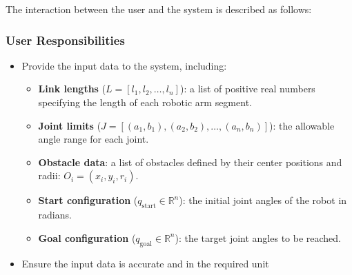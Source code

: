 \documentclass[12pt]{article}
\begin{document}
The interaction between the user and the system is described as follows:

\subsubsection*{User Responsibilities}
\begin{itemize}
    \item Provide the input data to the system, including:
    \begin{itemize}
        \item \textbf{Link lengths} (\(L = [l_1, l_2, \dots, l_n]\)): a list of positive real numbers specifying the length of each robotic arm segment.
        \item \textbf{Joint limits} (\(J = [(a_1, b_1), (a_2, b_2), \dots, (a_n, b_n)]\)): the allowable angle range for each joint.
        \item \textbf{Obstacle data}: a list of obstacles defined by their center positions and radii: \(O_i = (x_i, y_i, r_i)\).
        \item \textbf{Start configuration} (\(q_{\text{start}} \in \mathbb{R}^n\)): the initial joint angles of the robot in radians.
        \item \textbf{Goal configuration} (\(q_{\text{goal}} \in \mathbb{R}^n\)): the target joint angles to be reached.
    \end{itemize}
    \item Ensure the input data is accurate and in the required unit
    
\end{itemize}
\end{document}
